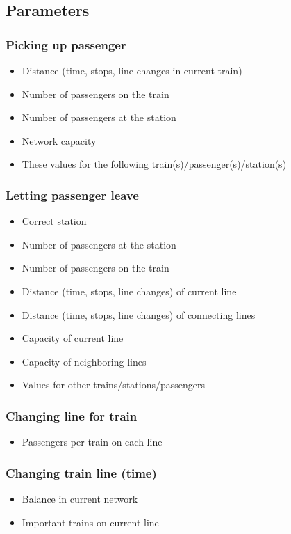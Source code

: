 \documentclass[10pt]{report}
\begin{document}
\subsection{Parameters}

\subsubsection{Picking up passenger}
\begin{itemize}
    \item Distance (time, stops, line changes in current train)
    \item Number of passengers on the train
    \item Number of passengers at the station
    \item Network capacity
    \item These values for the following train(s)/passenger(s)/station(s)
\end{itemize}

\subsubsection{Letting passenger leave}
\begin{itemize}
    \item Correct station
    \item Number of passengers at the station
    \item Number of passengers on the train
    \item Distance (time, stops, line changes) of current line
    \item Distance (time, stops, line changes) of connecting lines
    \item Capacity of current line
    \item Capacity of neighboring lines
    \item Values for other trains/stations/passengers
\end{itemize}

\subsubsection{Changing line for train}
\begin{itemize}
    \item Passengers per train on each line
\end{itemize}

\subsubsection{Changing train line (time)}
\begin{itemize}
    \item Balance in current network
    \item Important trains on current line
\end{itemize}
\end{document}
